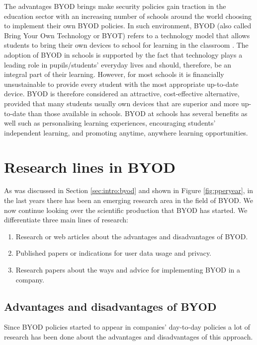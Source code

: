 The advantages BYOD brings make security policies gain traction in the education sector with an increasing number of schools around the world choosing to implement their own BYOD policies. In such environment, BYOD (also called Bring Your Own Technology or BYOT) refers to a technology model that allows students to bring their own devices to school for learning in the classroom \cite{sangani2013byod, song2014bring}. The adoption of BYOD in schools is supported by the fact that technology plays a leading role in
pupils/students' everyday lives and should, therefore, be an integral part of their learning. However, for most schools it is financially unsustainable to provide every student with the most appropriate up-to-date device. BYOD is therefore considered an attractive, cost-effective alternative, provided that many students usually own
devices that are superior and more up-to-date than those available in schools. BYOD at schools has several benefits as well such as personalising learning experiences, encouraging students' independent learning, and promoting anytime, anywhere learning opportunities.

\section{Research lines in BYOD}
\label{sec:researchBYOD}

As was discussed in Section \ref{sec:intro:byod} and shown in Figure \ref{fig:pperyear}, in the last years there has been an emerging research area in the field of BYOD. We now continue looking over the scientific production that BYOD has started. We differentiate three main lines of research:

\begin{enumerate}
	\item Research or web articles about the advantages and disadvantages of BYOD.
	\item Published papers or indications for user data usage and privacy.
	\item Research papers about the ways and advice for implementing BYOD in a company.
\end{enumerate}

\subsection{Advantages and disadvantages of BYOD}

Since BYOD policies started to appear in companies' day-to-day policies a lot of research has been done about the advantages and disadvantages of this approach.

